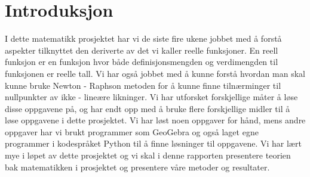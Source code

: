 \chapter{Introduksjon}
I dette matematikk prosjektet har vi de siste fire ukene jobbet med å forstå aspekter tilknyttet den deriverte av det vi kaller reelle funksjoner. En reell funksjon er en funksjon hvor både definisjonsmengden og verdimengden til funksjonen er reelle tall. Vi har også jobbet med å kunne forstå hvordan man skal kunne bruke Newton - Raphson metoden for å kunne finne tilnærminger til nullpunkter av ikke - lineære likninger. Vi har utforsket forskjellige måter å løse disse oppgavene på, og har endt opp med å bruke flere forskjellige midler til å løse oppgavene i dette prosjektet. Vi har løst noen oppgaver for hånd, mens andre oppgaver har vi brukt programmer som GeoGebra og også laget egne programmer i kodespråket Python til å finne løsninger til oppgavene. Vi har lært mye i løpet av dette prosjektet og vi skal i denne rapporten presentere teorien bak matematikken i prosjektet og presentere våre metoder og resultater. 
\\



